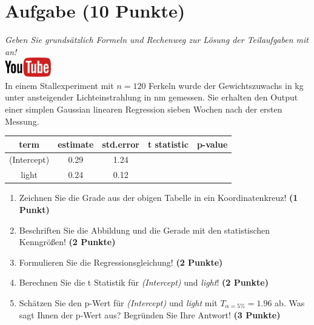 \documentclass[a4paper, 9pt]{scrartcl}\usepackage[]{graphicx}\usepackage[]{xcolor}
\begin{document}
\section{Aufgabe \hfill (10 Punkte)}

\textit{Geben Sie grunds{\"a}tzlich Formeln und Rechenweg zur L{\"o}sung der
  Teilaufgaben mit an!} \\[1Ex]

\hfill\href{https://youtu.be/lJp8rFmMnrs}{\includegraphics[width =
  2cm]{img/youtube}}\\[1Ex]



In einem Stallexperiment mit $n = 120$ Ferkeln wurde der
Gewichtszuwachs in kg unter ansteigender Lichteinstrahlung in nm
gemessen. Sie erhalten den \Rlogo Output einer simplen Gaussian linearen
Regression sieben Wochen nach der ersten Messung.

\begin{table}[!h]
\centering\begingroup\fontsize{14}{16}\selectfont

\begin{tabular}{ccccc}
\toprule
term & estimate & std.error & t statistic & p-value\\
\midrule
(Intercept) & 0.29 & 1.24 &  & \\
light & 0.24 & 0.12 &  & \\
\bottomrule
\end{tabular}
\endgroup{}
\end{table}



\begin{enumerate}
\item Zeichnen Sie die Grade aus der obigen Tabelle in ein Koordinatenkreuz! \textbf{(1 Punkt)}
\item Beschriften Sie die Abbildung und die Gerade mit den statistischen
  Kenngr{\"o}{\ss}en! \textbf{(2 Punkte)}
\item Formulieren Sie die Regressionsgleichung! \textbf{(2 Punkte)}
\item Berechnen Sie die t Statistik f{\"u}r \textit{(Intercept)} und
  \textit{light}! \textbf{(2 Punkte)}
\item Sch{\"a}tzen Sie den p-Wert f{\"u}r \textit{(Intercept)} und
  \textit{light} mit $T_{\alpha = 5\%} = 1.96$ ab. Was sagt Ihnen der p-Wert aus?
  Begr{\"u}nden Sie Ihre Antwort! \textbf{(3 Punkte)}
\end{enumerate} 
\clearpage
\end{document}
